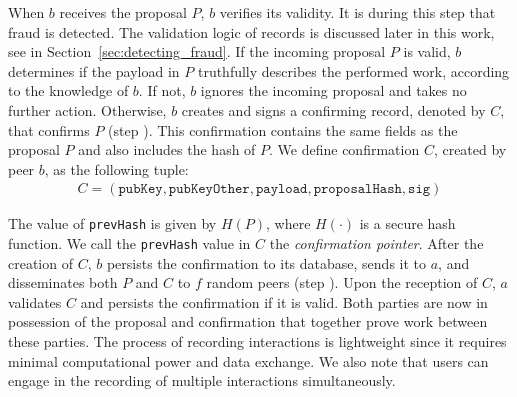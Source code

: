 When $ b $ receives the proposal $ P $, $ b $ verifies its validity.
It is during this step that fraud is detected.
The validation logic of records is discussed later in this work, see in Section~\ref{sec:detecting_fraud}.
If the incoming proposal $ P $ is valid, $ b $ determines if the payload in $ P $ truthfully describes the performed work, according to the knowledge of $ b $.
If not, $ b $ ignores the incoming proposal and takes no further action.
Otherwise, $ b $ creates and signs a confirming record, denoted by $ C $, that confirms $ P $ (step ).
This confirmation contains the same fields as the proposal $ P $ and also includes the hash of $ P $.
We define confirmation $ C $, created by peer $ b $, as the following tuple:
\begin{align*}
	C = (\texttt{pubKey}, \texttt{pubKeyOther}, \texttt{payload}, \texttt{proposalHash}, \texttt{sig})
\end{align*}

The value of \texttt{prevHash} is given by $ H(P) $, where $ H(\cdot) $ is a secure hash function.
We call the \texttt{prevHash} value in $ C $ the \emph{confirmation pointer}.
After the creation of $ C $, $ b $ persists the confirmation to its database, sends it to $ a $, and disseminates both $ P $ and $ C $ to $ f $ random peers (step ).
Upon the reception of $ C $, $ a $ validates $ C $ and persists the confirmation if it is valid.
Both parties are now in possession of the proposal and confirmation that together prove work between these parties.
The process of recording interactions is lightweight since it requires minimal computational power and data exchange. 
We also note that users can engage in the recording of multiple interactions simultaneously.




